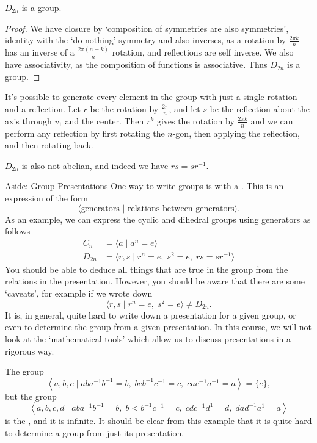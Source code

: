 \documentclass[a4]{scrreprt}
\begin{document}
\begin{proposition}
	$D_{2n}$ is a group.
\end{proposition}
\begin{proof}
	We have closure by `composition of symmetries are also symmetries', identity with the `do nothing' symmetry and also inverses, as a rotation by $\frac{2 \pi k}{n}$ has an inverse of a $\frac{2\pi(n - k)}{n}$ rotation, and reflections are self inverse. We also have associativity, as the composition of functions is associative. Thus $D_{2n}$ is a group. 
\end{proof}

It's possible to generate every element in the group with just a single rotation and a reflection. Let $r$ be the rotation by $\frac{2\pi}{n}$, and let $s$ be the reflection about the axis through $v_1$ and the center. Then $r^k$ gives the rotation by $\frac{2 \pi k}{n}$ and we can perform any reflection by first rotating the $n$-gon, then applying the reflection, and then rotating back. 

$D_{2n}$ is also not abelian, and indeed we have $rs = sr^{-1}$.

\begin{aside}{Aside: Group Presentations}
One way to write groups is with a . This is an expression of the form
$$
\langle \text{generators } \lvert \text{ relations between generators} \rangle.
$$
As an example, we can express the cyclic and dihedral groups using generators as follows
\begin{align*}
	C_n &= \langle a\mid  a^n = e \rangle \\
	D_{2n} &= \langle r, s \mid r^n = e,\; s^2 = e,\; rs = sr^{-1} \rangle
\end{align*}
You should be able to deduce all things that are true in the group from the relations in the presentation. However, you should be aware that there are some `caveats', for example if we wrote down
$$
\langle r, s \mid r^n = e, \; s^2 = e \rangle \neq D_{2n}.
$$
It is, in general, quite hard to write down a presentation for a given group, or even to determine the group from a given presentation. In this course, we will not look at the `mathematical tools' which allow us to discuss presentations in a rigorous 
way.

\begin{example}
	The group
	$$
	\left\langle a, b, c \mid a b a^{-1} b^{-1}=b, \; b c b^{-1} c^{-1}=c, \; cac^{-1} a^{-1}=a\right\rangle=\{e\},
	$$
	but the group
	$$
	\left\langle a, b, c, d \mid a b a^{-1} b^{-1}=b, \; b<b^{-1} c^{-1}=c,\; c d c^{-1} d^{1}=d, \; d a d^{-1} a^{1}=a\right\rangle
	$$
	is the , and it is infinite. It should be clear from this example that it is quite hard to determine a group from just its presentation.
\end{example}

\end{aside}
\end{document}

